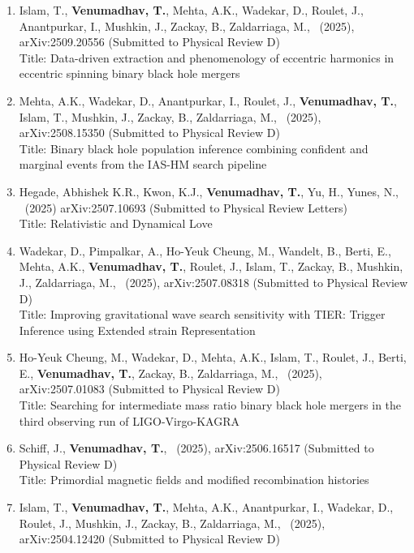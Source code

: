\documentclass{article}
\newlength{\cvindent}
\newenvironment{cvlist}{%
  \begin{list}{}{%
    \setlength{\leftmargin}{\cvindent}%
    \setlength{\rightmargin}{0pt}%
    \setlength{\topsep}{0pt}%
    \setlength{\partopsep}{0pt}%
    \setlength{\parsep}{0pt}%
    \setlength{\itemsep}{0pt}%
  }%
  \item\relax
}{%
  \end{list}
}
\begin{document}
\begin{cvlist}
	\begin{enumerate}
	      \item Islam, T., \textbf{Venumadhav, T.}, Mehta, A.K., Wadekar, D., Roulet, J., Anantpurkar, I., Mushkin, J., Zackay, B., Zaldarriaga, M., \ (2025), arXiv:2509.20556 (Submitted to Physical Review D) \\
	      Title: Data-driven extraction and phenomenology of eccentric harmonics in eccentric spinning binary black hole mergers
	      \item Mehta, A.K., Wadekar, D., Anantpurkar, I., Roulet, J., \textbf{Venumadhav, T.}, Islam, T., Mushkin, J., Zackay, B., Zaldarriaga, M., \ (2025), arXiv:2508.15350 (Submitted to Physical Review D) \\
	      Title: Binary black hole population inference combining confident and marginal events from the  IAS-HM search pipeline
	      \item Hegade, Abhishek K.R., Kwon, K.J., \textbf{Venumadhav, T.}, Yu, H., Yunes, N., \ (2025) arXiv:2507.10693 (Submitted to Physical Review Letters) \\
	      Title: Relativistic and Dynamical Love
	      \item Wadekar, D., Pimpalkar, A., Ho-Yeuk Cheung, M., Wandelt, B., Berti, E., Mehta, A.K., \textbf{Venumadhav, T.}, Roulet, J., Islam, T., Zackay, B., Mushkin, J., Zaldarriaga, M., \ (2025), arXiv:2507.08318 (Submitted to Physical Review D) \\
	      Title: Improving gravitational wave search sensitivity with TIER: Trigger Inference using Extended strain Representation
	      \item Ho-Yeuk Cheung, M., Wadekar, D., Mehta, A.K., Islam, T., Roulet, J., Berti, E., \textbf{Venumadhav, T.}, Zackay, B., Zaldarriaga, M., \ (2025), arXiv:2507.01083 (Submitted to Physical Review D) \\
	      Title: Searching for intermediate mass ratio binary black hole mergers in the third observing run of LIGO-Virgo-KAGRA
	      \item Schiff, J., \textbf{Venumadhav, T.}, \ (2025), arXiv:2506.16517 (Submitted to Physical Review D) \\
	      Title: Primordial magnetic fields and modified recombination histories
	      \item Islam, T., \textbf{Venumadhav, T.}, Mehta, A.K., Anantpurkar, I., Wadekar, D., Roulet, J., Mushkin, J., Zackay, B., Zaldarriaga, M., \ (2025), arXiv:2504.12420 (Submitted to Physical Review D) \\

\end{enumerate}
\end{cvlist}
\end{document}

